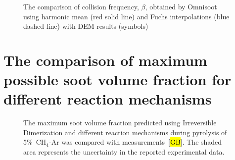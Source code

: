\begin{figure}[H]
	\centering
	\caption{The comparison of collision frequency, $\beta$, obtained by Omnisoot using harmonic mean (red solid line) and Fuchs interpolations (blue dashed line) with DEM results (symbols)~\citep{goudeli2015coagulation}}
	\label{fig:kernelvalid} 
\end{figure}

\section{The comparison of maximum possible soot volume fraction for different reaction mechanisms}

\begin{figure}[H]
	\centering
	\caption{The maximum soot volume fraction predicted using Irreversible Dimerization and different reaction mechanisms during pyrolysis of 5\%~$\mathrm{CH_4}$-Ar was compared with measurements~[\hl{GB}]. The shaded area represents the uncertainty in the reported experimental data.}
	\label{fig:max_sootfv_chem} 
\end{figure}

